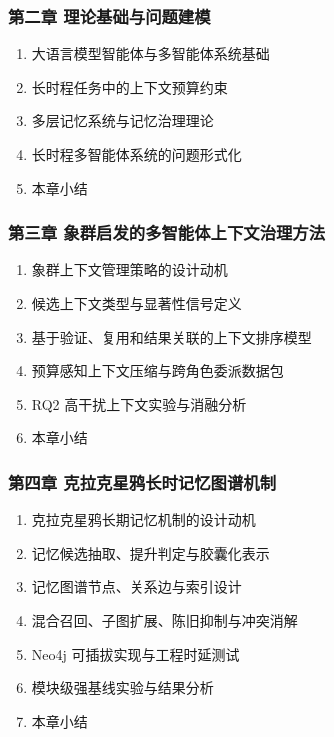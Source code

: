 \documentclass[UTF8,a4paper,zihao=-4,fontset=windows]{ctexart}
\begin{document}
\subsubsection*{第二章 理论基础与问题建模}
\begin{enumerate}[label=2.\arabic*]
  \item 大语言模型智能体与多智能体系统基础
  \item 长时程任务中的上下文预算约束
  \item 多层记忆系统与记忆治理理论
  \item 长时程多智能体系统的问题形式化
  \item 本章小结
\end{enumerate}

\subsubsection*{第三章 象群启发的多智能体上下文治理方法}
\begin{enumerate}[label=3.\arabic*]
  \item 象群上下文管理策略的设计动机
  \item 候选上下文类型与显著性信号定义
  \item 基于验证、复用和结果关联的上下文排序模型
  \item 预算感知上下文压缩与跨角色委派数据包
  \item RQ2 高干扰上下文实验与消融分析
  \item 本章小结
\end{enumerate}

\subsubsection*{第四章 克拉克星鸦长时记忆图谱机制}
\begin{enumerate}[label=4.\arabic*]
  \item 克拉克星鸦长期记忆机制的设计动机
  \item 记忆候选抽取、提升判定与胶囊化表示
  \item 记忆图谱节点、关系边与索引设计
  \item 混合召回、子图扩展、陈旧抑制与冲突消解
  \item Neo4j 可插拔实现与工程时延测试
  \item 模块级强基线实验与结果分析
  \item 本章小结
\end{enumerate}
\end{document}
